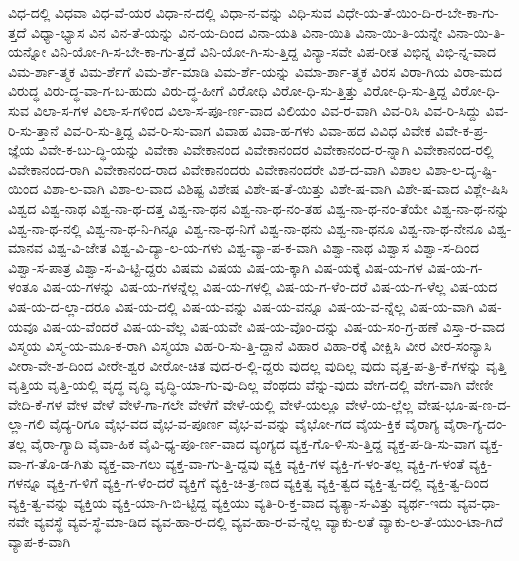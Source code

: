 {ವಿಧ-ದಲ್ಲಿ
ವಿಧವಾ
ವಿಧ-ವೆ-ಯರ
ವಿಧಾ-ನ-ದಲ್ಲಿ
ವಿಧಾ-ನ-ವನ್ನು
ವಿಧಿ-ಸುವ
ವಿಧೇ-ಯ-ತೆ-ಯಿಂ-ದಿ-ರ-ಬೇ-ಕಾ-ಗು-ತ್ತದೆ
ವಿಧ್ಯಾ-ಭ್ಯಾಸ
ವಿನ
ವಿನ-ತೆ-ಯನ್ನು
ವಿನ-ಯ-ದಿಂದ
ವಿನಾ-ಯತಿ
ವಿನಾ-ಯಿತಿ
ವಿನಾ-ಯಿ-ತಿ-ಯನ್ನೇ
ವಿನಾ-ಯಿ-ತಿ-ಯನ್ನೋ
ವಿನಿ-ಯೋ-ಗಿ-ಸ-ಬೇ-ಕಾ-ಗು-ತ್ತದೆ
ವಿನಿ-ಯೋ-ಗಿ-ಸು-ತ್ತಿದ್ದ
ವಿನ್ಯಾ-ಸವೇ
ವಿಪ-ರೀತ
ವಿಭಿನ್ನ
ವಿಭಿ-ನ್ನ-ವಾದ
ವಿಮ-ರ್ಶಾ-ತ್ಮಕ
ವಿಮ-ರ್ಶೆಗೆ
ವಿಮ-ರ್ಶೆ-ಮಾಡಿ
ವಿಮ-ರ್ಶೆ-ಯನ್ನು
ವಿಮಾ-ರ್ಶಾ-ತ್ಮಕ
ವಿರಸ
ವಿರಾ-ಗಿಯ
ವಿರಾ-ಮದ
ವಿರುದ್ಧ
ವಿರು-ದ್ಧ-ವಾ-ಗ-ಬ-ಹುದು
ವಿರು-ದ್ಧ-ಹೀಗೆ
ವಿರೋಧಿ
ವಿರೋ-ಧಿ-ಸು-ತ್ತಿತ್ತು
ವಿರೋ-ಧಿ-ಸು-ತ್ತಿದ್ದ
ವಿರೋ-ಧಿ-ಸುವ
ವಿಲಾ-ಸ-ಗಳ
ವಿಲಾ-ಸ-ಗಳಿಂದ
ವಿಲಾ-ಸ-ಪೂ-ರ್ಣ-ವಾದ
ವಿಲಿಯಂ
ವಿವ-ರ-ವಾಗಿ
ವಿವ-ರಿಸಿ
ವಿವ-ರಿ-ಸಿದ್ದು
ವಿವ-ರಿ-ಸು-ತ್ತಾನೆ
ವಿವ-ರಿ-ಸು-ತ್ತಿದ್ದ
ವಿವ-ರಿ-ಸು-ವಾಗ
ವಿವಾಹ
ವಿವಾ-ಹ-ಗಳು
ವಿವಾ-ಹದ
ವಿವಿಧ
ವಿವೇಕ
ವಿವೇ-ಕ-ಪ್ರ-ಜ್ಞೆಯ
ವಿವೇ-ಕ-ಬು-ದ್ಧಿ-ಯನ್ನು
ವಿವೇಕಾ
ವಿವೇಕಾನಂದ
ವಿವೇಕಾನಂದರ
ವಿವೇಕಾನಂದ-ರ-ನ್ನಾಗಿ
ವಿವೇಕಾನಂದ-ರಲ್ಲಿ
ವಿವೇಕಾನಂದ-ರಾಗಿ
ವಿವೇಕಾನಂದ-ರಾದ
ವಿವೇಕಾನಂದರು
ವಿವೇಕಾನಂದರೇ
ವಿಶ-ದ-ವಾಗಿ
ವಿಶಾಲ
ವಿಶಾ-ಲ-ದೃ-ಷ್ಟಿ-ಯಿಂದ
ವಿಶಾ-ಲ-ವಾಗಿ
ವಿಶಾ-ಲ-ವಾದ
ವಿಶಿಷ್ಟ
ವಿಶೇಷ
ವಿಶೇ-ಷ-ತೆ-ಯಿತ್ತು
ವಿಶೇ-ಷ-ವಾಗಿ
ವಿಶೇ-ಷ-ವಾದ
ವಿಶ್ಲೇ-ಷಿಸಿ
ವಿಶ್ವದ
ವಿಶ್ವ-ನಾಥ
ವಿಶ್ವ-ನಾ-ಥ-ದತ್ತ
ವಿಶ್ವ-ನಾ-ಥನ
ವಿಶ್ವ-ನಾ-ಥ-ನಂ-ತಹ
ವಿಶ್ವ-ನಾ-ಥ-ನಂ-ತೆಯೇ
ವಿಶ್ವ-ನಾ-ಥ-ನನ್ನು
ವಿಶ್ವ-ನಾ-ಥ-ನಲ್ಲಿ
ವಿಶ್ವ-ನಾ-ಥ-ನಿ-ಗಿನ್ನೂ
ವಿಶ್ವ-ನಾ-ಥ-ನಿಗೆ
ವಿಶ್ವ-ನಾ-ಥನು
ವಿಶ್ವ-ನಾ-ಥನೂ
ವಿಶ್ವ-ನಾ-ಥ-ನೇನೂ
ವಿಶ್ವ-ಮಾನವ
ವಿಶ್ವ-ವಿ-ಜೇತ
ವಿಶ್ವ-ವಿ-ದ್ಯಾ-ಲ-ಯ-ಗಳು
ವಿಶ್ವ-ವ್ಯಾ-ಪ-ಕ-ವಾಗಿ
ವಿಶ್ವಾ-ನಾಥ
ವಿಶ್ವಾಸ
ವಿಶ್ವಾ-ಸ-ದಿಂದ
ವಿಶ್ವಾ-ಸ-ಪಾತ್ರ
ವಿಶ್ವಾ-ಸ-ವಿ-ಟ್ಟಿ-ದ್ದರು
ವಿಷಮ
ವಿಷಯ
ವಿಷ-ಯ-ಕ್ಕಾಗಿ
ವಿಷ-ಯಕ್ಕೆ
ವಿಷ-ಯ-ಗಳ
ವಿಷ-ಯ-ಗ-ಳಂತೂ
ವಿಷ-ಯ-ಗಳನ್ನು
ವಿಷ-ಯ-ಗಳನ್ನೆಲ್ಲ
ವಿಷ-ಯ-ಗಳಲ್ಲಿ
ವಿಷ-ಯ-ಗ-ಳೆಂ-ದರೆ
ವಿಷ-ಯ-ಗ-ಳೆಲ್ಲ
ವಿಷ-ಯದ
ವಿಷ-ಯ-ದ-ಲ್ಲಾ-ದರೂ
ವಿಷ-ಯ-ದಲ್ಲಿ
ವಿಷ-ಯ-ವನ್ನು
ವಿಷ-ಯ-ವನ್ನೂ
ವಿಷ-ಯ-ವ-ನ್ನೆಲ್ಲ
ವಿಷ-ಯ-ವಾಗಿ
ವಿಷ-ಯವೂ
ವಿಷ-ಯ-ವೆಂದರೆ
ವಿಷ-ಯ-ವೆಲ್ಲ
ವಿಷ-ಯವೇ
ವಿಷ-ಯ-ವೊಂ-ದನ್ನು
ವಿಷ-ಯ-ಸಂ-ಗ್ರ-ಹಣೆ
ವಿಸ್ತಾ-ರ-ವಾದ
ವಿಸ್ಮಯ
ವಿಸ್ಮ-ಯ-ಮೂ-ಕ-ರಾಗಿ
ವಿಸ್ಮಯಾ
ವಿಹ-ರಿ-ಸು-ತ್ತಿ-ದ್ದಾನೆ
ವಿಹಾರ
ವಿಹಾ-ರಕ್ಕೆ
ವೀಕ್ಷಿಸಿ
ವೀರ
ವೀರ-ಸಂನ್ಯಾಸಿ
ವೀರಾ-ವೇ-ಶ-ದಿಂದ
ವೀರೇ-ಶ್ವರ
ವೀರೋ-ಚಿತ
ವುದ-ರ-ಲ್ಲಿ-ದ್ದರು
ವುದಲ್ಲ
ವುದಿಲ್ಲ
ವುದು
ವೃತ್ತ-ಪ-ತ್ರಿ-ಕೆ-ಗಳನ್ನು
ವೃತ್ತಿ
ವೃತ್ತಿಯ
ವೃತ್ತಿ-ಯಲ್ಲಿ
ವೃದ್ಧ
ವೃದ್ಧಿ
ವೃದ್ಧಿ-ಯಾ-ಗು-ವು-ದಿಲ್ಲ
ವೆಂಥದು
ವೆನ್ನು-ವುದು
ವೇಗ-ದಲ್ಲಿ
ವೇಗ-ವಾಗಿ
ವೇಣೀ
ವೇದಿ-ಕೆ-ಗಳ
ವೇಳ
ವೇಳೆ
ವೇಳೆ-ಗಾ-ಗಲೇ
ವೇಳೆಗೆ
ವೇಳೆ-ಯಲ್ಲಿ
ವೇಳೆ-ಯಲ್ಲೂ
ವೇಳೆ-ಯ-ಲ್ಲೆಲ್ಲ
ವೇಷ-ಭೂ-ಷ-ಣ-ದ-ಲ್ಲಾ-ಗಲಿ
ವೈದ್ಯ-ರಿಗೂ
ವೈಭ-ವದ
ವೈಭ-ವ-ಪೂರ್ಣ
ವೈಭ-ವ-ವನ್ನು
ವೈಭೋ-ಗದ
ವೈಯ-ಕ್ತಿಕ
ವೈರಾಗ್ಯ
ವೈರಾ-ಗ್ಯ-ದಂ-ತಲ್ಲ
ವೈರಾ-ಗ್ಯಾದಿ
ವೈವಾ-ಹಿಕ
ವೈವಿ-ಧ್ಯ-ಪೂ-ರ್ಣ-ವಾದ
ವ್ಯಂಗ್ಯದ
ವ್ಯಕ್ತ-ಗೊ-ಳಿ-ಸು-ತ್ತಿದ್ದ
ವ್ಯಕ್ತ-ಪ-ಡಿ-ಸು-ವಾಗ
ವ್ಯಕ್ತ-ವಾ-ಗ-ತೊ-ಡ-ಗಿತು
ವ್ಯಕ್ತ-ವಾ-ಗಲು
ವ್ಯಕ್ತ-ವಾ-ಗು-ತ್ತಿ-ದ್ದವು
ವ್ಯಕ್ತಿ
ವ್ಯಕ್ತಿ-ಗಳ
ವ್ಯಕ್ತಿ-ಗ-ಳಂ-ತಲ್ಲ
ವ್ಯಕ್ತಿ-ಗ-ಳಂತೆ
ವ್ಯಕ್ತಿ-ಗಳನ್ನೂ
ವ್ಯಕ್ತಿ-ಗ-ಳಿಗೆ
ವ್ಯಕ್ತಿ-ಗ-ಳೆಂ-ದರೆ
ವ್ಯಕ್ತಿಗೆ
ವ್ಯಕ್ತಿ-ಚಿ-ತ್ರ-ಣದ
ವ್ಯಕ್ತಿತ್ವ
ವ್ಯಕ್ತಿ-ತ್ವದ
ವ್ಯಕ್ತಿ-ತ್ವ-ದಲ್ಲಿ
ವ್ಯಕ್ತಿ-ತ್ವ-ದಿಂದ
ವ್ಯಕ್ತಿ-ತ್ವ-ವನ್ನು
ವ್ಯಕ್ತಿಯ
ವ್ಯಕ್ತಿ-ಯಾ-ಗಿ-ಬಿ-ಟ್ಟಿದ್ದ
ವ್ಯಕ್ತಿಯು
ವ್ಯತಿ-ರಿ-ಕ್ತ-ವಾದ
ವ್ಯತ್ಯಾ-ಸ-ವಿತ್ತು
ವ್ಯರ್ಥ-ಇದು
ವ್ಯವ-ಧಾ-ನವೇ
ವ್ಯವಸ್ಥೆ
ವ್ಯವ-ಸ್ಥೆ-ಮಾ-ಡಿದ
ವ್ಯವ-ಹಾ-ರ-ದಲ್ಲಿ
ವ್ಯವ-ಹಾ-ರ-ವ-ನ್ನೆಲ್ಲ
ವ್ಯಾಕು-ಲತೆ
ವ್ಯಾಕು-ಲ-ತೆ-ಯುಂ-ಟಾ-ಗಿದೆ
ವ್ಯಾಪ-ಕ-ವಾಗಿ
}

